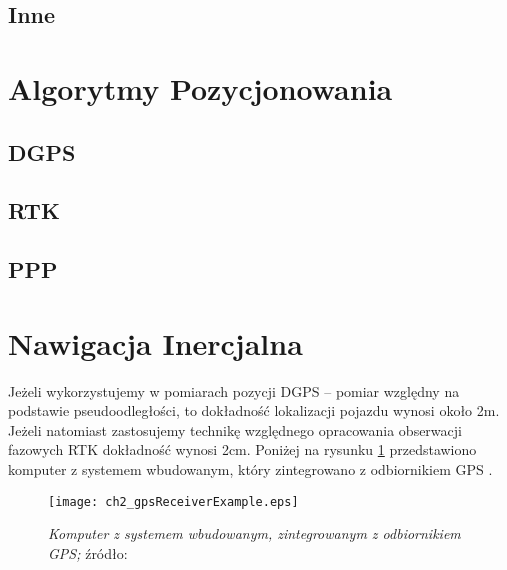 	\subsection{Inne}
\section{Algorytmy Pozycjonowania}
	\subsection{DGPS}
	\subsection{RTK}
	\subsection{PPP}
\section{Nawigacja Inercjalna}
\noindent
Jeżeli wykorzystujemy w pomiarach pozycji DGPS – pomiar względny na podstawie pseudoodległości,
to dokładność lokalizacji pojazdu wynosi około 2m. 
Jeżeli natomiast zastosujemy technikę względnego opracowania obserwacji fazowych RTK dokładność wynosi 2cm.
Poniżej na rysunku \ref{fig:ch2_gpsReceiverExample} przedstawiono komputer z systemem wbudowanym,
który zintegrowano z odbiornikiem GPS \cite{CCTA_951_958}.
\begin{figure}[H]
\centering
\texttt{[image: ch2\_gpsReceiverExample.eps]}
\caption{\textit{Komputer z systemem wbudowanym, zintegrowanym z odbiornikiem GPS;} źródło: \cite[][strona 952]{CCTA_951_958}}
\label{fig:ch2_gpsReceiverExample}
\end{figure}
\noindent
